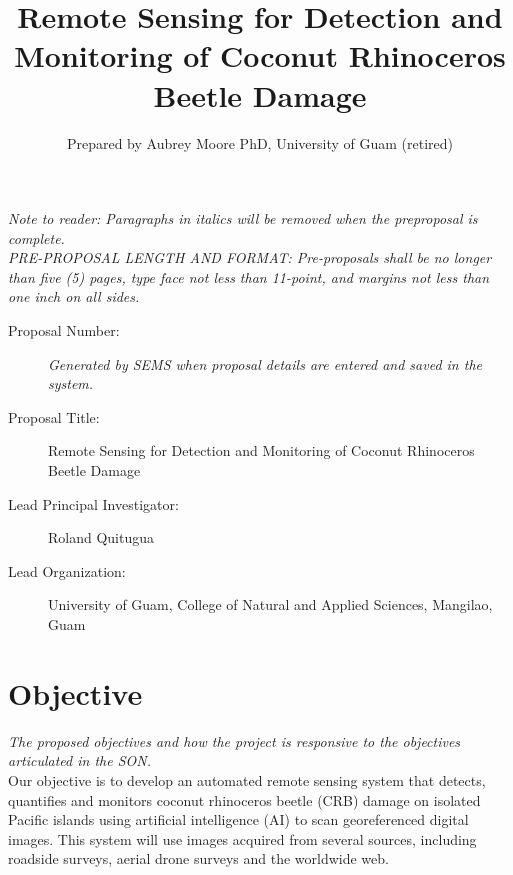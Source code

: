 \documentclass[11pt,english,letterpaper]{scrartcl}
\begin{document}
\titlehead{DRAFT SERDP FY25 PREPROPOSAL}
\title{Remote Sensing for Detection and Monitoring of Coconut Rhinoceros Beetle Damage}
\author{Prepared by Aubrey Moore PhD, University of Guam (retired)}

\maketitle

\tableofcontents{}\clearpage{}

\textit{Note to reader: Paragraphs in italics will be removed when the preproposal is complete.} \\

\textit{PRE-PROPOSAL LENGTH AND FORMAT: 
Pre-proposals shall be no longer than five (5) pages, type face not less than 11-point, and margins not less than one inch on all sides.} 

\begin{description}
		
\item[Proposal Number:] \emph{Generated by SEMS when proposal details are entered and saved in the system.}

\item[Proposal Title:] Remote Sensing for Detection and Monitoring of Coconut Rhinoceros Beetle Damage

\item[Lead Principal Investigator:] Roland Quitugua

\item[Lead Organization:] University of Guam, College of Natural and Applied Sciences, Mangilao, Guam

\end{description}

\section{Objective}

\textit{The proposed objectives and how the project is responsive to the objectives articulated in the SON.}\\
	
Our objective is to develop an automated remote sensing system that detects, quantifies and monitors coconut rhinoceros beetle (CRB) damage on isolated Pacific islands using artificial intelligence (AI) to scan georeferenced digital images. This system will use images acquired from several sources, including roadside surveys, aerial drone surveys and the worldwide web.
\end{document}
